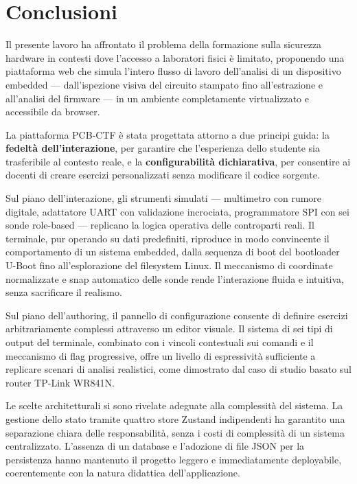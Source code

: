 \chapter*{Conclusioni}

Il presente lavoro ha affrontato il problema della formazione sulla sicurezza hardware in contesti dove l'accesso a laboratori fisici è limitato, proponendo una piattaforma web che simula l'intero flusso di lavoro dell'analisi di un dispositivo embedded --- dall'ispezione visiva del circuito stampato fino all'estrazione e all'analisi del firmware --- in un ambiente completamente virtualizzato e accessibile da browser.

La piattaforma PCB-CTF è stata progettata attorno a due principi guida: la \textbf{fedeltà dell'interazione}, per garantire che l'esperienza dello studente sia trasferibile al contesto reale, e la \textbf{configurabilità dichiarativa}, per consentire ai docenti di creare esercizi personalizzati senza modificare il codice sorgente.

Sul piano dell'interazione, gli strumenti simulati --- multimetro con rumore digitale, adattatore UART con validazione incrociata, programmatore SPI con sei sonde role-based --- replicano la logica operativa delle controparti reali. Il terminale, pur operando su dati predefiniti, riproduce in modo convincente il comportamento di un sistema embedded, dalla sequenza di boot del bootloader U-Boot fino all'esplorazione del filesystem Linux. Il meccanismo di coordinate normalizzate e snap automatico delle sonde rende l'interazione fluida e intuitiva, senza sacrificare il realismo.

Sul piano dell'authoring, il pannello di configurazione consente di definire esercizi arbitrariamente complessi attraverso un editor visuale. Il sistema di sei tipi di output del terminale, combinato con i vincoli contestuali sui comandi e il meccanismo di flag progressive, offre un livello di espressività sufficiente a replicare scenari di analisi realistici, come dimostrato dal caso di studio basato sul router TP-Link WR841N.

Le scelte architetturali si sono rivelate adeguate alla complessità del sistema. La gestione dello stato tramite quattro store Zustand indipendenti ha garantito una separazione chiara delle responsabilità, senza i costi di complessità di un sistema centralizzato. L'assenza di un database e l'adozione di file JSON per la persistenza hanno mantenuto il progetto leggero e immediatamente deployabile, coerentemente con la natura didattica dell'applicazione.

